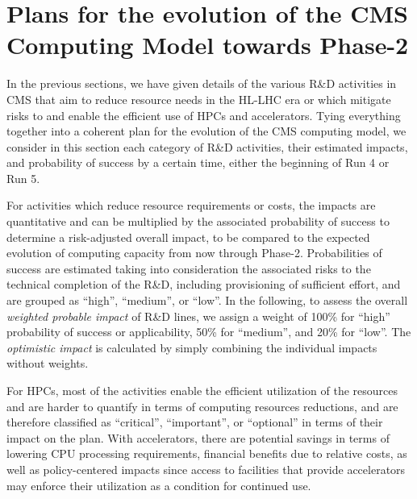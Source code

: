 \documentclass{cmspaper}
\begin{document}
\begin{table}[ht]
{\begin{center}
\begin{tabular}{llllll}
\end{tabular}
\end{center}
}
\end{table}


\section{Plans for the evolution of the CMS Computing Model towards Phase-2}
\label{sec:plan_for_the_evo}

In the previous sections, we have given details of the various R\&D activities in CMS that aim to reduce resource needs in the HL-LHC era or which mitigate risks to and enable the efficient use of HPCs and accelerators. Tying everything together into a coherent plan for the evolution of the CMS computing model, we consider in this section each category of R\&D activities, their estimated impacts, and probability of success by a certain time, either the beginning of Run 4 or Run 5. 

For activities which reduce resource requirements or costs, the impacts are quantitative and can be multiplied by the associated probability of success to determine a risk-adjusted overall impact, to be compared to the expected evolution of computing capacity from now through Phase-2. Probabilities of success are estimated taking into consideration the associated risks to the technical completion of the R\&D, including provisioning of sufficient effort, and are grouped as ``high'', ``medium'', or ``low''. In the following, to assess the overall \textit{weighted probable impact} of R\&D lines, we assign a weight of 100\% for ``high'' probability of success or applicability, 50\% for ``medium'', and 20\% for ``low''. The \textit{optimistic impact} is calculated by simply combining the individual impacts without weights.

For HPCs, most of the activities enable the efficient utilization of the resources and are harder to quantify in terms of computing resources reductions, and are therefore classified as ``critical'', ``important'', or ``optional'' in terms of their impact on the plan. With accelerators, there are potential savings in terms of lowering CPU processing requirements, financial benefits due to relative costs, as well as policy-centered impacts since access to facilities that provide accelerators may enforce their utilization as a condition for continued use. 
\end{document}
